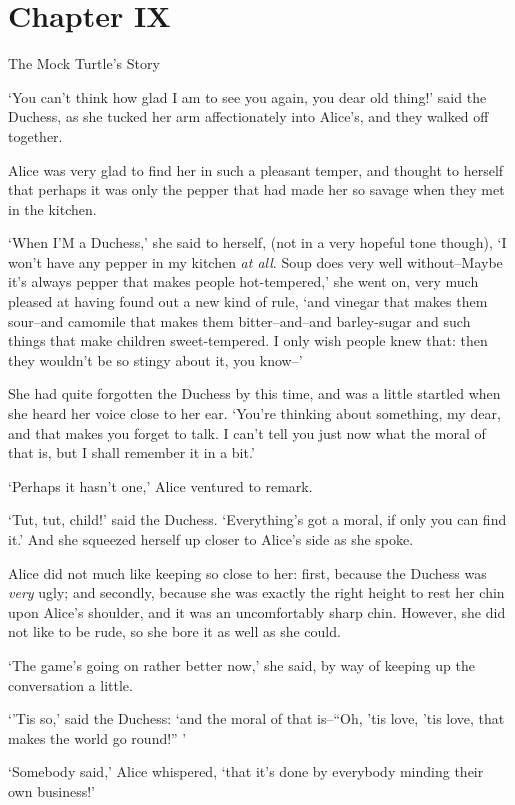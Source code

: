 \chapter{Chapter IX}{The Mock Turtle's Story}


  `You can't think how glad I am to see you again, you dear old
thing!' said the Duchess, as she tucked her arm affectionately
into Alice's, and they walked off together.

  Alice was very glad to find her in such a pleasant temper, and
thought to herself that perhaps it was only the pepper that had
made her so savage when they met in the kitchen.

  `When I'M a Duchess,' she said to herself, (not in a very
hopeful tone though), `I won't have any pepper in my kitchen {\it at all}.
Soup does very well without--Maybe it's always pepper that
makes people hot-tempered,' she went on, very much pleased at
having found out a new kind of rule, `and vinegar that makes them
sour--and camomile that makes them bitter--and--and barley-sugar
and such things that make children sweet-tempered.  I only wish
people knew that:  then they wouldn't be so stingy about it, you
know--'

  She had quite forgotten the Duchess by this time, and was a
little startled when she heard her voice close to her ear.
`You're thinking about something, my dear, and that makes you
forget to talk.  I can't tell you just now what the moral of that
is, but I shall remember it in a bit.'

  `Perhaps it hasn't one,' Alice ventured to remark.

  `Tut, tut, child!' said the Duchess.  `Everything's got a
moral, if only you can find it.'  And she squeezed herself up
closer to Alice's side as she spoke.

  Alice did not much like keeping so close to her:  first,
because the Duchess was {\it very} ugly; and secondly, because she was
exactly the right height to rest her chin upon Alice's shoulder,
and it was an uncomfortably sharp chin.  However, she did not
like to be rude, so she bore it as well as she could.

  `The game's going on rather better now,' she said, by way of
keeping up the conversation a little.

  `'Tis so,' said the Duchess:  `and the moral of that is--``Oh,
'tis love, 'tis love, that makes the world go round!'' '

  `Somebody said,' Alice whispered, `that it's done by everybody
minding their own business!'

